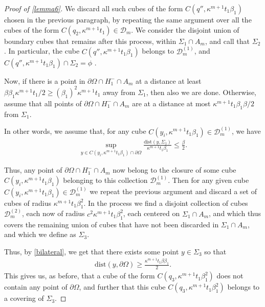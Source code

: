 \documentclass{article}
\newcounter{lem}
\theoremstyle{plain}
\theoremstyle{plain}
\newcommand{\en}{\beta_1}
\theoremstyle{definition}
\theoremstyle{plain}
\begin{document}
\begin{proof}[Proof of \cref{lemma6}]
  We discard all such cubes of the form $ C(q'', \kappa^{m+1} t_1 \en)$ chosen in the previous paragraph, by repeating the same argument over all the cubes of the form $C(q_2,\kappa^{m+1}t_1)\in \mathcal{D}_m$. We consider the disjoint union of boundary cubes that remains after this process, within $\Sigma_1\cap A_m$, and call that $\Sigma_2$. In particular, the cube $C(q'', \kappa^{m+1} t_1 \en)$ belongs to $\mathcal{D}_{m}^{(1)}$, and $C(q'', \kappa^{m+1} t_1 \en)\cap \Sigma_2 =\phi$ . 
 
 
 
 

Now, if there is a point in $\partial\Omega\cap H^{-}_1 \cap A_m$ at a distance at least $\beta \en \kappa^{m+1} t_1/2 \geq (\en)^2 \kappa^{m+1} t_1 $ away from $\Sigma_1$, then also we are done. Otherwise, assume that all points of $\partial\Omega\cap H^{-}_1 \cap A_m$ are at a distance at most $ \kappa^{m+1} t_1\en \beta/2$ from $\Sigma_1$.

In other words, we assume that, for any cube $C(y_i, \kappa^{m+1} t_1\beta_1)\in \mathcal{D}^{(1)}_m$, we have
\begin{align}
    \sup\limits_{y\in C(y_i, \kappa^{m+1} t_1\beta_1)\cap \partial\Omega} \frac{\text{dist}(y,\Sigma_1)}{\kappa^{m+1} t_1\beta_1}\leq \frac{\beta}{2}.
\end{align}


Thus, any point of $\partial\Omega\cap H^{-}_1 \cap A_m$ now belong to the closure of some cube $C(y_i, \kappa^{m+1} t_1\beta_1)$ belonging to this collection $\mathcal{D}_{m}^{(1)}$. Then for any given cube $C(y_i, \kappa^{m+1} t_1 \beta_1)\in \mathcal{D}_{m}^{(1)}$  we repeat the previous argument and discard a set of cubes of radius $ \kappa^{m+1} t_1 \beta^{2}_1$. In the process we find a disjoint collection of cubes $\mathcal{D}_{m}^{(2)}$, each now of radius $c^2 \kappa^{m+1} t_1\beta^{2}_1$, each centered on $\Sigma_1\cap A_m$, and which thus covers the remaining union of cubes that have not been discarded in $\Sigma_1\cap A_m$, and which we define as $\Sigma_3$.





Thus, by \cref{bilateral}, we get that there exists some point $y\in \Sigma_3$ so that 
\begin{align}
    \text{dist}(y,\partial\Omega)\geq \frac{\kappa^{m+1} t_1 \beta\en}{2} .
\end{align}
This gives us, as before, that a cube of the form $C(q_3, \kappa^{m+1} t_1 \beta_{1}^{2})$  does not contain any point of $\partial\Omega$, and further that this cube $C(q_3, \kappa^{m+1} t_1 \beta_{1}^{2})$ belongs to a covering of $\Sigma_3$.


\end{proof}
\end{document}
